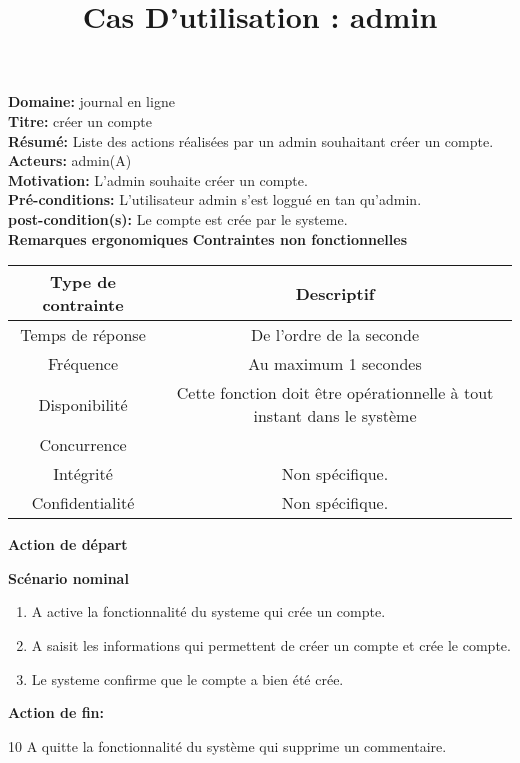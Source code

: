 \documentclass[a4paper,10pt]{article}
\title{Cas D'utilisation : admin}
\author{}
\begin{document}
\maketitle



\textbf{Domaine:} journal en ligne\\
\textbf{Titre:} créer un compte\\
\textbf{Résumé:} Liste des actions réalisées par un admin souhaitant créer un compte.\\
\textbf{Acteurs:} admin(A)\\
\textbf{Motivation:} L'admin souhaite créer un compte.\\
\textbf{Pré-conditions:} L'utilisateur admin s'est loggué en tan qu'admin.\\
\textbf{post-condition(s):} Le compte est crée par le systeme.\\

\textbf{Remarques ergonomiques}
\textbf{Contraintes non fonctionnelles}
\begin{center}
  \begin{tabular}{|c|c|}
\hline
   \textbf{Type de contrainte}&\textbf{Descriptif}\\
\hline
Temps de réponse&De l'ordre de la seconde\\
\hline
Fréquence & Au maximum 1 secondes\\
\hline
Disponibilité & Cette fonction doit être opérationnelle à tout instant dans le système\\
\hline
Concurrence&\\
\hline
Intégrité&Non spécifique.\\
\hline
Confidentialité& Non spécifique.\\
\hline

  \end{tabular}
\end{center}

\textbf{Action de départ}

\textbf{Scénario nominal}
\begin{enumerate}
\item A active la fonctionnalité du systeme qui crée un compte.
\item A saisit les informations qui permettent de créer un compte et crée le compte.
\item Le systeme confirme que le compte a bien été crée.
\end{enumerate}

\textbf{Action de fin:}

10 A quitte la fonctionnalité du système qui supprime un commentaire.
\end{document}
